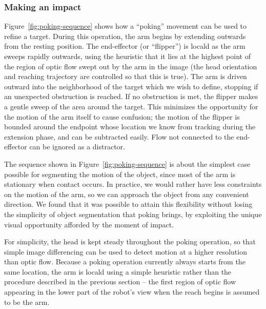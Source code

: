 \subsubsection*{Making an impact}

Figure~\ref{fig:poking-sequence} shows how a ``poking'' movement can
be used to refine a target.  During this operation, the arm begins
by extending outwards from the resting position.  The end-effector (or
``flipper'') is local\ize{}d as the arm sweeps rapidly outwards, using
the heuristic that it lies at the highest point of the region of optic
flow swept out by the arm in the image (the head orientation and
reaching trajectory are controlled so that this is true).  The arm is
driven outward into the neighborhood of the target which we wish to
define, stopping if an unexpected obstruction is reached.  If no
obstruction is met, the flipper makes a gentle sweep of the area
around the target.  This minimizes the opportunity for the motion of
the arm itself to cause confusion; the motion of the flipper is
bounded around the endpoint whose location we know from tracking
during the extension phase, and can be subtracted easily.  Flow not
connected to the end-effector can be ignored as a distractor.


The sequence shown in Figure~\ref{fig:poking-sequence} is about the
simplest case possible for segmenting the motion of the object, since most of the arm is stationary
when contact occurs.  In practice, we would rather have less
constraints on the motion of the arm, so we can approach the object
from any convenient direction.  We found that it was possible 
to attain this flexibility without losing the simplicity of object
segmentation that poking brings, by exploiting the unique
visual opportunity afforded by the moment of impact.


\ifverbose
For simplicity, the head is kept steady throughout the poking
operation, so that simple image differencing can be used to detect
motion at a higher resolution than optic flow.  Because a poking
operation currently always starts from the same location, the arm
is local\ize{}d using a simple heuristic rather than the procedure described
in the previous section -- the first region of optic flow appearing
in the lower part of the robot's view when the reach begins
is assumed to be the arm.
\fi

